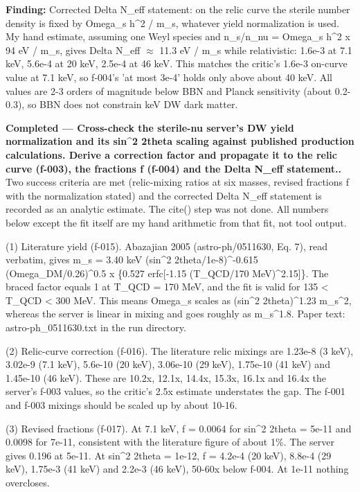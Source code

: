 \documentclass[11pt,a4paper]{article}
\begin{document}
\textbf{Finding:} Corrected Delta N\_eff statement: on the relic curve the sterile number density is fixed by Omega\_s h\textasciicircum{}2 / m\_s, whatever yield normalization is used. My hand estimate, assuming one Weyl species and n\_s/n\_nu = Omega\_s h\textasciicircum{}2 x 94 eV / m\_s, gives Delta N\_eff $\approx$ 11.3 eV / m\_s while relativistic: 1.6e-3 at 7.1 keV, 5.6e-4 at 20 keV, 2.5e-4 at 46 keV. This matches the critic's 1.6e-3 on-curve value at 7.1 keV, so f-004's 'at most 3e-4' holds only above about 40 keV. All values are 2-3 orders of magnitude below BBN and Planck sensitivity (about 0.2-0.3), so BBN does not constrain keV DW dark matter.

\textbf{Completed --- Cross-check the sterile-nu server's DW yield normalization and its sin\textasciicircum{}2 2theta scaling against published production calculations. Derive a correction factor and propagate it to the relic curve (f-003), the fractions f (f-004) and the Delta N\_eff statement..} Two success criteria are met (relic-mixing ratios at six masses, revised fractions f with the normalization stated) and the corrected Delta N\_eff statement is recorded as an analytic estimate. The cite() step was not done. All numbers below except the fit itself are my hand arithmetic from that fit, not tool output.

(1) Literature yield (f-015). Abazajian 2005 (astro-ph/0511630, Eq. 7), read verbatim, gives m\_s = 3.40 keV (sin\textasciicircum{}2 2theta/1e-8)\textasciicircum{}-0.615 (Omega\_DM/0.26)\textasciicircum{}0.5 x \{0.527 erfc[-1.15 (T\_QCD/170 MeV)\textasciicircum{}2.15]\}. The braced factor equals 1 at T\_QCD = 170 MeV, and the fit is valid for 135 \textless{} T\_QCD \textless{} 300 MeV. This means Omega\_s scales as (sin\textasciicircum{}2 2theta)\textasciicircum{}1.23 m\_s\textasciicircum{}2, whereas the server is linear in mixing and goes roughly as m\_s\textasciicircum{}1.8. Paper text: astro-ph\_0511630.txt in the run directory.

(2) Relic-curve correction (f-016). The literature relic mixings are 1.23e-8 (3 keV), 3.02e-9 (7.1 keV), 5.6e-10 (20 keV), 3.06e-10 (29 keV), 1.75e-10 (41 keV) and 1.45e-10 (46 keV). These are 10.2x, 12.1x, 14.4x, 15.3x, 16.1x and 16.4x the server's f-003 values, so the critic's 2.5x estimate understates the gap. The f-001 and f-003 mixings should be scaled up by about 10-16.

(3) Revised fractions (f-017). At 7.1 keV, f = 0.0064 for sin\textasciicircum{}2 2theta = 5e-11 and 0.0098 for 7e-11, consistent with the literature figure of about 1\%. The server gives 0.196 at 5e-11. At sin\textasciicircum{}2 2theta = 1e-12, f = 4.2e-4 (20 keV), 8.8e-4 (29 keV), 1.75e-3 (41 keV) and 2.2e-3 (46 keV), 50-60x below f-004. At 1e-11 nothing overcloses.
\end{document}
